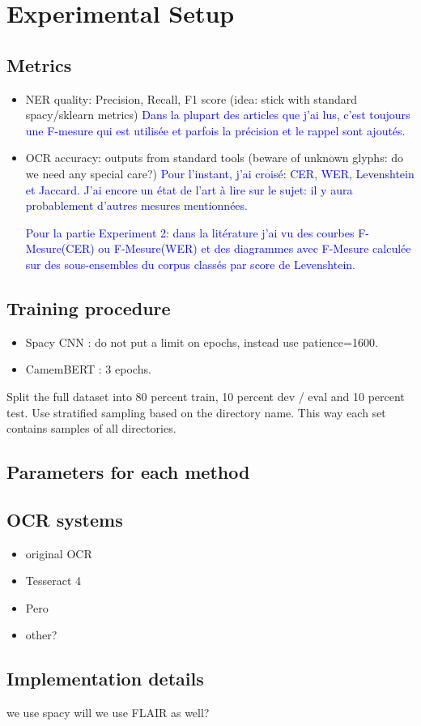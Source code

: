 \section{Experimental Setup}

\subsection{Metrics}
\begin{itemize}
    \item NER quality: Precision, Recall, F1 score (idea: stick with standard spacy/sklearn metrics) \textcolor{blue}{Dans la plupart des articles que j'ai lus, c'est toujours une F-mesure qui est utilisée et parfois la précision et le rappel sont ajoutés.}
    \item OCR accuracy: outputs from standard tools (beware of unknown glyphs: do we need any special care?) \textcolor{blue}{Pour l'instant, j'ai croisé: CER, WER, Levenshtein et Jaccard. J'ai encore un état de l'art à lire sur le sujet: il y aura probablement d'autres mesures mentionnées.}
    
    \textcolor{blue}{Pour la partie Experiment 2: dans la litérature j'ai vu des courbes F-Mesure(CER) ou F-Mesure(WER) et des diagrammes avec F-Mesure calculée sur des sous-ensembles du corpus classés par score de Levenshtein.}
\end{itemize}

\subsection{Training procedure}
\begin{itemize}
\item Spacy CNN : do not put a limit on epochs, instead use patience=1600.
\item CamemBERT : 3 epochs.
\end{itemize}

Split the full dataset into 80 percent train, 10 percent dev / eval and 10 percent test.
Use stratified sampling based on the directory name. This way each set contains samples of all directories. 






\subsection{Parameters for each method}

\subsection{OCR systems}
\begin{itemize}
    \item original OCR
    \item Tesseract 4
    \item Pero
    \item other?
\end{itemize}

\subsection{Implementation details}
we use spacy 
will we use FLAIR as well?
